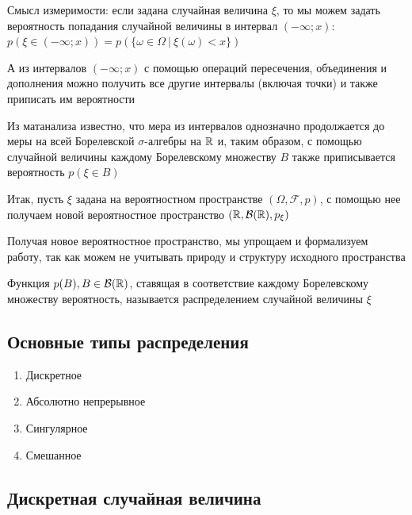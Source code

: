 \documentclass[12pt]{article}
\begin{document}
    \Nota Смысл измеримости: если задана случайная величина $\xi$, то мы можем задать вероятность попадания случайной
    величины в интервал $(-\infty; x)$: $p(\xi \in (-\infty; x)) = p(\{\omega \in \Omega \ | \ \xi(\omega) < x\})$

    А из интервалов $(-\infty; x)$ с помощью операций пересечения, объединения и дополнения можно получить все другие
    интервалы (включая точки) и также приписать им вероятности

    Из матанализа известно, что мера из интервалов однозначно продолжается до меры на всей Борелевской $\sigma$-алгебры на $\mathbb{R}$
    и, таким образом, с помощью случайной величины каждому Борелевскому множеству $B$ также приписывается вероятность $p(\xi \in B)$

    \hypertarget{probabilityspacerbp}{}

    Итак, пусть $\xi$ задана на вероятностном пространстве $(\Omega, \mathcal{F}, p)$, с помощью нее получаем новой вероятностное
    пространство $(\mathbb{R}, \mathcal{B}(\mathbb{R}), p_\xi)$

    Получая новое вероятностное пространство, мы упрощаем и формализуем работу, так как можем не учитывать природу и структуру исходного пространства

    \hypertarget{randomvaluedistribution}{}

    \Def Функция $p(B), B \in \mathcal{B}(\mathbb{R})$, ставящая в соответствие каждому Борелевскому множеству вероятность,
    называется распределением случайной величины $\xi$

    \subsection{Основные типы распределения}

    \begin{enumerate}[label=\alph*) ]
        \item Дискретное

        \item Абсолютно непрерывное

        \item Сингулярное

        \item Смешанное
    \end{enumerate}

    \subsection{Дискретная случайная величина}
\end{document}
